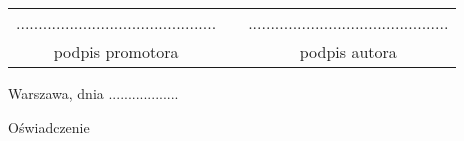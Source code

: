 \documentclass[a4paper,11pt,twoside]{report}
\theoremstyle{definition}
\newcommand{\tytul}{Zastosowania metod procesowania w języku polskim}
\begin{document}
\sloppy

%

\thispagestyle{empty}\newpage
\null
\vfill
\begin{center}
\begin{tabular}[t]{ccc}
............................................. & \hspace*{100pt} & .............................................\\
podpis promotora & \hspace*{100pt} & podpis autora
\end{tabular}
\end{center}


{
\begin{abstract}

\begin{center}
\tytul
\end{center}
Praca zawiera przegląd dostęPnych rozwiązań i metod dostępnych w zakresie NLP (natural language processing) dla języka polskiego wraz z ich zastosowaniem na przykładowym zbiorze danych tekstowych i analizą rezultatów. \\


\end{abstract}
}

\null\thispagestyle{empty}\newpage


\null\thispagestyle{empty}\newpage

\null \hfill Warszawa, dnia ..................\\

\par\vspace{5cm}

\begin{center}
Oświadczenie
\end{center}
\end{document}
